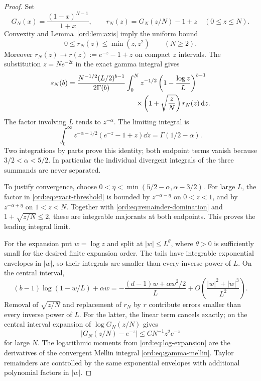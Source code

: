 \begin{proof}
Set
\[
 G_N(x)=\frac{(1-x)^{N-1}}{1+x},\qquad
 r_N(z)=G_N(z/N)-1+z\quad(0\le z\le N).
\]
Convexity and Lemma~\ref{ord:lem:axis} imply the uniform bound
\begin{equation}\label{ord:eq:remainder-domination}
 0\le r_N(z)\le\min(z,z^2)\qquad(N\ge2).
\end{equation}
Moreover $r_N(z)\to r(z):=e^{-z}-1+z$ on compact $z$ intervals.
The substitution $z=Ne^{-2t}$ in the exact gamma integral gives
\begin{equation}\label{ord:eq:exact-threshold}
 \begin{split}
 \eps_N(b)={}&\frac{N^{-1/2}(L/2)^{b-1}}{2\Gamma(b)}
 \int_0^N z^{-1/2}
       \left(1-\frac{\log z}L\right)^{b-1}\\
 &\hspace{28mm}\mathrel{}\times
       \left(1+\sqrt{\frac zN}\right)r_N(z)\dd z.
 \end{split}
\end{equation}
The factor involving $L$ tends to $z^{-\alpha}$. The limiting integral is
\begin{equation}\label{ord:eq:gamma-mellin}
 \int_0^\infty z^{-\alpha-1/2}(e^{-z}-1+z)\dd z
       =\Gamma(1/2-\alpha).
\end{equation}
Two integrations by parts prove this identity; both endpoint terms
vanish because $3/2<\alpha<5/2$. In particular the individual divergent
integrals of the three summands are never separated.

To justify convergence, choose
$0<\eta<\min(5/2-\alpha,\alpha-3/2)$. For large $L$, the factor in
\eqref{ord:eq:exact-threshold} is bounded by $z^{-\alpha-\eta}$ on
$0<z<1$, and by $z^{-\alpha+\eta}$ on $1<z<N$.
Together with \eqref{ord:eq:remainder-domination} and
$1+\sqrt{z/N}\le2$, these are integrable majorants at both endpoints.
This proves the leading integral limit.

For the expansion put $w=\log z$ and split at $|w|\le L^\theta$, where
$\theta>0$ is sufficiently small for the desired finite expansion order.
The tails have integrable exponential envelopes in $|w|$, so their
integrals are smaller than every inverse power of $L$. On the central
interval,
\begin{equation}\label{ord:eq:log-expansion}
 (b-1)\log(1-w/L)+\alpha w
 =-\frac{(d-1)w+\alpha w^2/2}{L}
   +O\!\left(\frac{|w|^2+|w|^3}{L^2}\right).
\end{equation}
Removal of $\sqrt{z/N}$ and replacement of $r_N$ by $r$ contribute
errors smaller than every inverse power of $L$. For the latter,
the linear term cancels exactly; on the central interval expansion of
$\log G_N(z/N)$ gives
\[
 |G_N(z/N)-e^{-z}|\le C N^{-1}z^2e^{-z}
\]
for large $N$. The logarithmic moments from
\eqref{ord:eq:log-expansion} are the derivatives of the convergent
Mellin integral \eqref{ord:eq:gamma-mellin}. Taylor remainders are
controlled by the same exponential envelopes with additional polynomial
factors in $|w|$.


\end{proof}

